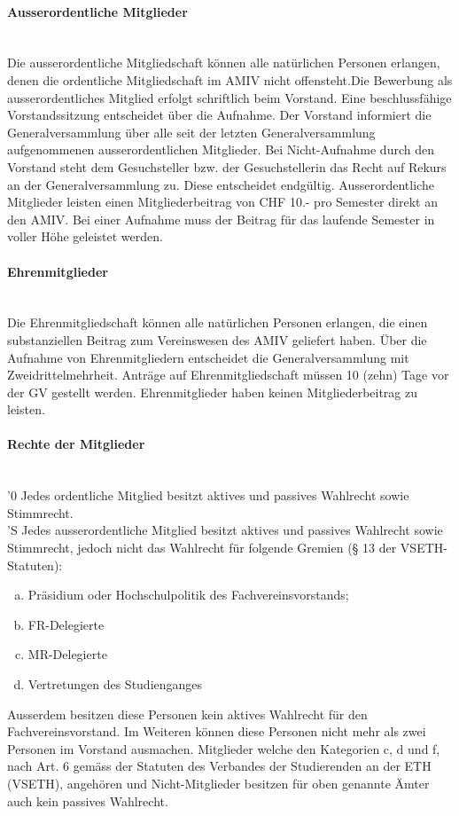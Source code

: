 \documentclass[a4paper,11pt]{article}
\newcommand{\nl}{\\[1.5ex]}
\begin{document}
\paragraph{Ausserordentliche Mitglieder} \ \\
Die ausserordentliche Mitgliedschaft können alle natürlichen Personen erlangen, denen die ordentliche Mitgliedschaft im AMIV nicht offensteht.Die Bewerbung als ausserordentliches Mitglied erfolgt schriftlich beim Vorstand. Eine beschlussfähige Vorstandssitzung entscheidet über die Aufnahme. Der Vorstand informiert die Generalversammlung über alle seit der letzten Generalversammlung aufgenommenen ausserordentlichen Mitglieder. Bei Nicht-Aufnahme durch den Vorstand steht dem Gesuchsteller bzw. der Gesuchstellerin das Recht auf Rekurs an der Generalversammlung zu. Diese entscheidet endgültig.
Ausserordentliche Mitglieder leisten einen Mitgliederbeitrag von CHF 10.- pro Semester direkt an den AMIV. Bei einer Aufnahme muss der Beitrag für das laufende Semester in voller Höhe geleistet werden.


\paragraph{Ehrenmitglieder} \ \\
Die Ehrenmitgliedschaft können alle natürlichen Personen erlangen, die einen substanziellen Beitrag zum Vereinswesen des AMIV geliefert haben. Über die Aufnahme von Ehrenmitgliedern entscheidet die Generalversammlung mit Zweidrittelmehrheit. Anträge auf Ehrenmitgliedschaft müssen 10 (zehn) Tage vor der GV gestellt werden.
Ehrenmitglieder haben keinen Mitgliederbeitrag zu leisten.


\paragraph{Rechte der Mitglieder}\label{Rechte_der_Mitglieder} \ \\
'0 Jedes ordentliche Mitglied besitzt aktives und passives Wahlrecht sowie Stimmrecht.\nl
'S Jedes ausserordentliche Mitglied besitzt aktives und passives Wahlrecht sowie Stimmrecht, jedoch nicht das Wahlrecht für folgende Gremien (§ 13 der VSETH-Statuten):
\begin{enumerate}[(a)]
    \item Präsidium oder Hochschulpolitik des Fachvereinsvorstands;
    \item FR-Delegierte
    \item MR-Delegierte
    \item Vertretungen des Studienganges
\end{enumerate}
Ausserdem besitzen diese Personen kein aktives Wahlrecht für den Fachvereinsvorstand. Im Weiteren können diese Personen nicht mehr als zwei Personen im Vorstand ausmachen. Mitglieder welche den Kategorien c, d und f, nach Art. 6 gemäss der Statuten des Verbandes der Studierenden an der ETH (VSETH), angehören und Nicht-Mitglieder besitzen für oben genannte Ämter auch kein passives Wahlrecht.
\end{document}
